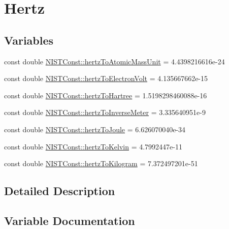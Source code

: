 \hypertarget{group___n_i_s_t_const-_hertz}{}\section{Hertz}
\label{group___n_i_s_t_const-_hertz}
\subsection*{Variables}
\begin{DoxyCompactItemize}
\item 
const double \hyperlink{group___n_i_s_t_const-_hertz_ga5e2fd7ea13ae13a34435ff0578082d34}{N\+I\+S\+T\+Const\+::hertz\+To\+Atomic\+Mass\+Unit} = 4.\+4398216616e-\/24
\item 
const double \hyperlink{group___n_i_s_t_const-_hertz_ga035f43de5d8ad8208675c53a0057d14d}{N\+I\+S\+T\+Const\+::hertz\+To\+Electron\+Volt} = 4.\+135667662e-\/15
\item 
const double \hyperlink{group___n_i_s_t_const-_hertz_ga2ededb8b750b44cde6d83c1c07b6a870}{N\+I\+S\+T\+Const\+::hertz\+To\+Hartree} = 1.\+5198298460088e-\/16
\item 
const double \hyperlink{group___n_i_s_t_const-_hertz_ga6d5ccd7fed8ad7f2abb5c368565a1666}{N\+I\+S\+T\+Const\+::hertz\+To\+Inverse\+Meter} = 3.\+335640951e-\/9
\item 
const double \hyperlink{group___n_i_s_t_const-_hertz_ga827c4e99287fcd5363fabcfe1381cc37}{N\+I\+S\+T\+Const\+::hertz\+To\+Joule} = 6.\+626070040e-\/34
\item 
const double \hyperlink{group___n_i_s_t_const-_hertz_gacda137a5d10ebba59b340d770802678f}{N\+I\+S\+T\+Const\+::hertz\+To\+Kelvin} = 4.\+7992447e-\/11
\item 
const double \hyperlink{group___n_i_s_t_const-_hertz_ga7b63758ab74cb80c236d4eacd5b89484}{N\+I\+S\+T\+Const\+::hertz\+To\+Kilogram} = 7.\+372497201e-\/51
\end{DoxyCompactItemize}


\subsection{Detailed Description}


\subsection{Variable Documentation}
\mbox{\label{group___n_i_s_t_const-_hertz_ga5e2fd7ea13ae13a34435ff0578082d34}} 
